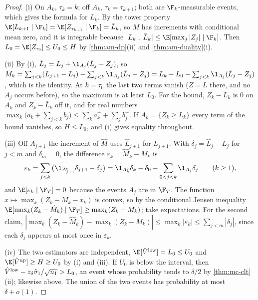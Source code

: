 \begin{proof}
(i) On $A_k$, $\tau_k=k$; off $A_k$, $\tau_k=\tau_{k+1}$; both are $\F_k$-measurable events,
which gives the formula for $L_k$. By the tower property
$\E[L_{k+1}\mid\F_k]=\E[Z_{\tau_{k+1}}\mid\F_k]=\bar L_k$, so $M$ has increments with
conditional mean zero, and it is integrable because
$|L_k|,|\bar L_k|\le\E[\max_j|Z_j|\mid\F_k]$. Then $L_0=\E[Z_{\tau_0}]\le U_0\le H$ by
\cref{thm:am-dp}(ii) and \cref{thm:am-duality}(i).

(ii) By (i), $\bar L_j=L_j+\1_{A_j}(\bar L_j-Z_j)$, so
$M_k=\sum_{j<k}(L_{j+1}-L_j)-\sum_{j<k}\1_{A_j}(\bar L_j-Z_j)=L_k-L_0-\sum_{j<k}\1_{A_j}(\bar L_j-Z_j)$,
which is the identity. At $k=\tau_0$ the last two terms vanish ($Z=L$ there, and no
$A_j$ occurs before), so the maximum is at least $L_0$. For the bound, $Z_k-L_k$ is $0$ on
$A_k$ and $Z_k-\bar L_k$ off it, and for real numbers
$\max_k\big(a_k+\sum_{j<k}b_j\big)\le\sum_ka_k^++\sum_jb_j^+$. If $A_k=\{Z_k\ge\bar L_k\}$
every term of the bound vanishes, so $H\le L_0$, and (i) gives equality throughout.

(iii) Off $A_{j+1}$ the increment of $\hat M$ uses $\hat L_{j+1}$ for $L_{j+1}$. With
$\delta_j=\hat L_j-\bar L_j$ for $j<m$ and $\delta_m=0$, the difference
$\varepsilon_k=\hat M_k-M_k$ is
\[
  \varepsilon_k=\sum_{j<k}\big(\1_{A^c_{j+1}}\delta_{j+1}-\delta_j\big)
  =\1_{A^c_k}\delta_k-\delta_0-\sum_{0<j<k}\1_{A_j}\delta_j\qquad(k\ge1),
\]
and $\E[\varepsilon_k\mid\F_T]=0$ because the events $A_j$ are in $\F_T$. The function
$x\mapsto\max_k(Z_k-M_k-x_k)$ is convex, so by the conditional Jensen inequality
$\E[\max_k(Z_k-\hat M_k)\mid\F_T]\ge\max_k(Z_k-M_k)$; take expectations. For the second
claim, $|\max_k(Z_k-\hat M_k)-\max_k(Z_k-M_k)|\le\max_k|\varepsilon_k|\le\sum_{j<m}|\delta_j|$,
since each $\delta_j$ appears at most once in $\varepsilon_k$.

(iv) The two estimators are independent, $\E[\hat V^{\rm low}]=L_0\le U_0$ and
$\E[\hat V^{\rm up}]\ge H\ge U_0$ by (i) and (iii). If $U_0$ is below the interval, then
$\hat V^{\rm low}-z_\delta\hat\sigma_1/\sqrt{n_1}>L_0$, an event whose probability tends to
$\delta/2$ by \cref{thm:mc-clt}(ii); likewise above. The union of the two events has
probability at most $\delta+o(1)$.
\end{proof}

